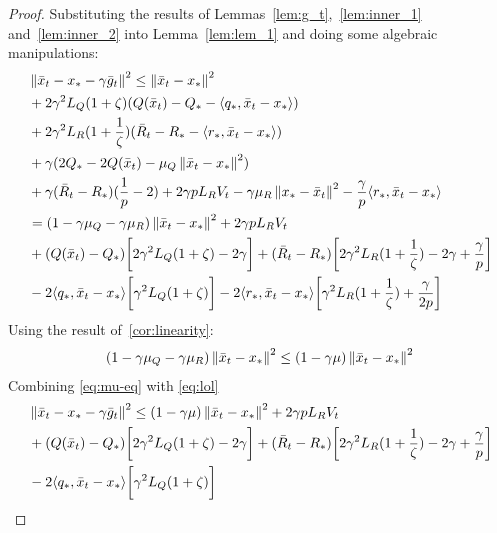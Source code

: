 \begin{proof} Substituting the results of Lemmas~\ref{lem:g_t},~\ref{lem:inner_1} and~\ref{lem:inner_2} into Lemma~\ref{lem:lem_1} and doing some algebraic manipulations:
    \begin{align}
        \begin{split}
            &\left\|\bar{x}_t - x_* - \gamma \bar{g}_t\right\|^2 \leq \left\|\bar{x}_t - x_*\right\|^2 \\
            &+ 2\gamma^2 L_Q (1 + \zeta) (Q(\bar{x}_t) - Q_* - \langle q_*, \bar{x}_t - x_*\rangle) \\
            &+ 2\gamma^2 L_R (1 + \frac{1}{\zeta}) (\bar{R}_t - R_* - \langle r_*, \bar{x}_t - x_*\rangle) \\
            &+ \gamma ( 2 Q_* - 2 Q(\bar{x}_t) - \mu_Q \left\|\bar{x}_t - x_*\right\|^2 ) \\
            &+ \gamma(\bar{R}_t - R_*)(\frac{1}{p} - 2) + 2 \gamma p L_R V_t - \gamma \mu_R \left\|x_* - \bar{x}_t\right\|^2 - \frac{\gamma}{p}\langle r_*, \bar{x}_t - x_*\rangle\\
            &= (1 - \gamma \mu_Q - \gamma \mu_R)\left\|\bar{x}_t - x_*\right\|^2 + 2 \gamma p L_R V_t \\
            &+ (Q(\bar{x}_t) - Q_*)\biggr[ 2\gamma^2 L_Q (1+\zeta) - 2\gamma \biggr]
            + (\bar{R}_t - R_*)\biggr[ 2\gamma^2 L_R (1+\frac{1}{\zeta}) - 2\gamma + \frac{\gamma}{p} \biggr] \\
            &- 2\langle q_*, \bar{x}_t - x_*\rangle\biggr[ \gamma^2 L_Q(1+\zeta) \biggr]
            - 2\langle r_*, \bar{x}_t - x_*\rangle\biggr[ \gamma^2 L_R(1+\frac{1}{\zeta}) + \frac{\gamma}{2p} \biggr] \label{eq:lol}
        \end{split}
    \end{align}
    Using the result of~\ref{cor:linearity}:
    \begin{align}
        (1 - \gamma \mu_Q - \gamma \mu_R)\left\|\bar{x}_t - x_*\right\|^2 \leq (1 - \gamma \mu)\left\|\bar{x}_t - x_*\right\|^2 \label{eq:mu-eq}
    \end{align}
    Combining \eqref{eq:mu-eq} with \eqref{eq:lol}
    \begin{align}
        \begin{split}
             &\norm{\bar{x}_t - x_* - \gamma \bar{g}_t}^2 \leq 
            (1 - \gamma \mu)\norm{\bar{x}_t - x_*}^2 + 2 \gamma p L_R V_t \\
            &+ (Q(\bar{x}_t) - Q_*)\coef {2\gamma^2 L_Q (1+\zeta) - 2\gamma}
            + (\bar{R}_t - R_*)\coef{2\gamma^2 L_R (1+\frac{1}{\zeta}) - 2\gamma + \frac{\gamma}{p}} \\
            &- 2\inner{q_*}{\bar{x}_t - x_*}\coef{\gamma^2 L_Q(1+\zeta)}

\end{split}
\end{align}
\end{proof}
